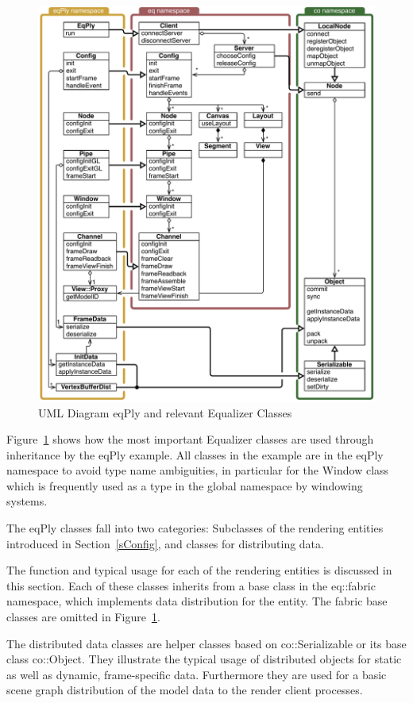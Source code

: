 \documentclass[10pt,a4]{scrartcl}
\newcommand{\fig}[1]{Figure~\ref{#1}}
\newcommand{\sref}[1]{Section~\ref{#1}}
\begin{document}
\begin{figure}[ht!]\center
  \includegraphics[width=.9\textwidth]{images/uml}
  {\caption{\label{fUml}UML Diagram eqPly and relevant Equalizer Classes}}
\end{figure}

\fig{fUml} shows how the most important Equalizer classes are used through
inheritance by the \textsf{eqPly} example. All classes in the example are in the
\textsf{eqPly} namespace to avoid type name ambiguities, in particular for the
\textsf{Window} class which is frequently used as a type in the global namespace
by windowing systems.

The \textsf{eqPly} classes fall into two categories: Subclasses of the
rendering entities introduced in \sref{sConfig}, and classes for
distributing data.

The function and typical usage for each of the rendering entities is discussed
in this section. Each of these classes inherits from a base class in the
\textsf{eq::fabric} name\-space, which implements data distribution for the
entity. The fabric base classes are omitted in \fig{fUml}.

The distributed data classes are helper classes based on
\textsf{co::Serializable} or its base class \textsf{co::Object}. They illustrate
the typical usage of distributed objects for static as well as dynamic,
frame-specific data. Furthermore they are used for a basic scene graph
distribution of the model data to the render client processes.
\end{document}
